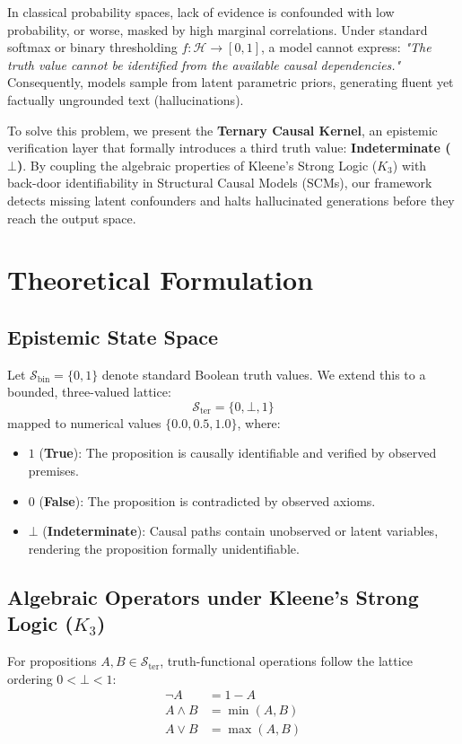 \documentclass[conference]{IEEEtran}
\begin{document}
In classical probability spaces, lack of evidence is confounded with low probability, or worse, masked by high marginal correlations. Under standard softmax or binary thresholding $f: \mathcal{H} \to [0,1]$, a model cannot express: \textit{"The truth value cannot be identified from the available causal dependencies."} Consequently, models sample from latent parametric priors, generating fluent yet factually ungrounded text (hallucinations).

To solve this problem, we present the \textbf{Ternary Causal Kernel}, an epistemic verification layer that formally introduces a third truth value: \textbf{Indeterminate ($\bot$)}. By coupling the algebraic properties of Kleene's Strong Logic ($K_3$) with back-door identifiability in Structural Causal Models (SCMs), our framework detects missing latent confounders and halts hallucinated generations before they reach the output space.

\section{Theoretical Formulation}

\subsection{Epistemic State Space}
Let $\mathcal{S}_{\text{bin}} = \{0, 1\}$ denote standard Boolean truth values. We extend this to a bounded, three-valued lattice:
\begin{equation}
\mathcal{S}_{\text{ter}} = \{0, \bot, 1\}
\end{equation}
mapped to numerical values $\{0.0, 0.5, 1.0\}$, where:
\begin{itemize}
    \item $1$ (\textbf{True}): The proposition is causally identifiable and verified by observed premises.
    \item $0$ (\textbf{False}): The proposition is contradicted by observed axioms.
    \item $\bot$ (\textbf{Indeterminate}): Causal paths contain unobserved or latent variables, rendering the proposition formally unidentifiable.
\end{itemize}

\subsection{Algebraic Operators under Kleene's Strong Logic ($K_3$)}
For propositions $A, B \in \mathcal{S}_{\text{ter}}$, truth-functional operations follow the lattice ordering $0 < \bot < 1$:
\begin{align}
\neg A &= 1 - A \\
A \land B &= \min(A, B) \\
A \lor B &= \max(A, B)
\end{align}
\end{document}
